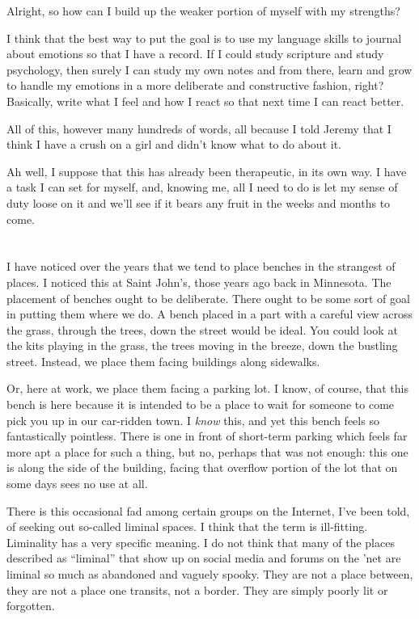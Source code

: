 Alright, so how can I build up the weaker portion of myself with my strengths?

I think that the best way to put the goal is to use my language skills to journal about emotions so that I have a record. If I could study scripture and study psychology, then surely I can study my own notes and from there, learn and grow to handle my emotions in a more deliberate and constructive fashion, right? Basically, write what I feel and how I react so that next time I can react better.

All of this, however many hundreds of words, all because I told Jeremy that I think I have a crush on a girl and didn't know what to do about it.

Ah well, I suppose that this has already been therapeutic, in its own way. I have a task I can set for myself, and, knowing me, all I need to do is let my sense of duty loose on it and we'll see if it bears any fruit in the weeks and months to come.

\section{}

I have noticed over the years that we tend to place benches in the strangest of places. I noticed this at Saint John's, those years ago back in Minnesota. The placement of benches ought to be deliberate. There ought to be some sort of goal in putting them where we do. A bench placed in a part with a careful view across the grass, through the trees, down the street would be ideal. You could look at the kits playing in the grass, the trees moving in the breeze, down the bustling street. Instead, we place them facing buildings along sidewalks.

Or, here at work, we place them facing a parking lot. I know, of course, that this bench is here because it is intended to be a place to wait for someone to come pick you up in our car-ridden town. I \emph{know} this, and yet this bench feels so fantastically pointless. There is one in front of short-term parking which feels far more apt a place for such a thing, but no, perhaps that was not enough: this one is along the side of the building, facing that overflow portion of the lot that on some days sees no use at all.

There is this occasional fad among certain groups on the Internet, I've been told, of seeking out so-called liminal spaces. I think that the term is ill-fitting. Liminality has a very specific meaning. I do not think that many of the places described as ``liminal'' that show up on social media and forums on the 'net are liminal so much as abandoned and vaguely spooky. They are not a place between, they are not a place one transits, not a border. They are simply poorly lit or forgotten.

